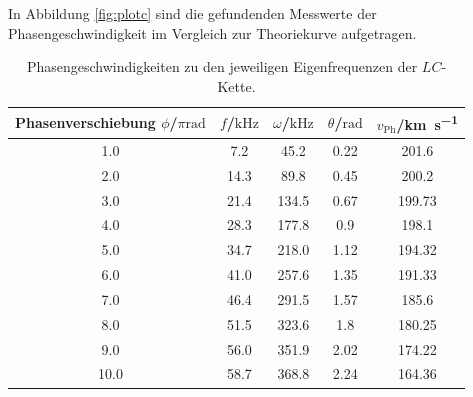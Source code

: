 In Abbildung \ref{fig:plotc} sind die gefundenden Messwerte der Phasengeschwindigkeit im Vergleich zur Theoriekurve aufgetragen.
\begin{table}
	\caption{Phasengeschwindigkeiten zu den jeweiligen Eigenfrequenzen der $LC$-Kette.}
	\label{tab:c}
	\centering
	\begin{tabular}{ccccc}
		\toprule
		Phasenverschiebung $\phi$/$\pi\si{\radian}$ & $f$/$\si{\kilo\Hz}$ & $\omega$/$\si{\kilo\Hz}$ & $\theta$/$\si{\radian}$ & $v_{\mathrm{Ph}}$/\si{\kilo\metre\per\second} \\
		\midrule
		1.0                                         & 7.2                 & 45.2                     & 0.22                    & 201.6                                         \\
		2.0                                         & 14.3                & 89.8                     & 0.45                    & 200.2                                         \\
		3.0                                         & 21.4                & 134.5                    & 0.67                    & 199.73                                        \\
		4.0                                         & 28.3                & 177.8                    & 0.9                     & 198.1                                         \\
		5.0                                         & 34.7                & 218.0                    & 1.12                    & 194.32                                        \\
		6.0                                         & 41.0                & 257.6                    & 1.35                    & 191.33                                        \\
		7.0                                         & 46.4                & 291.5                    & 1.57                    & 185.6                                         \\
		8.0                                         & 51.5                & 323.6                    & 1.8                     & 180.25                                        \\
		9.0                                         & 56.0                & 351.9                    & 2.02                    & 174.22                                        \\
		10.0                                        & 58.7                & 368.8                    & 2.24                    & 164.36                                        \\

\end{tabular}
\end{table}
